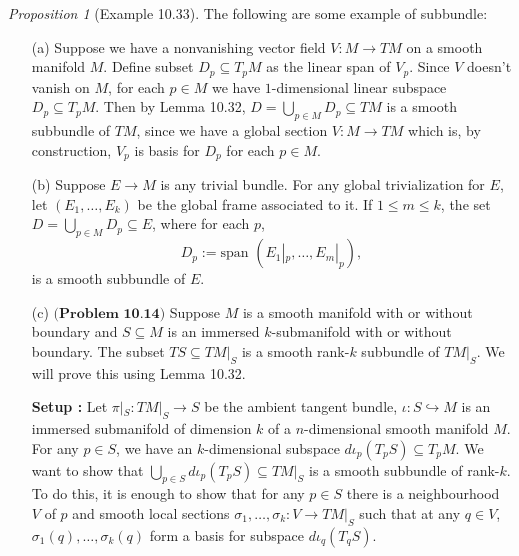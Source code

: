 \documentclass[a4paper]{article}
\theoremstyle{remark}
\newtheorem{prop}{Proposition}
\newcommand{\subhim}{\subseteq} %
\begin{document}
\begin{prop}[Example 10.33]
The following are some example of subbundle:
\begin{enumerate}
\item[(a)] Suppose we have a nonvanishing vector field $V : M \to TM$ on a smooth manifold $M$. Define subset $D_p \subhim T_pM$ as the linear span of $V_p$. Since $V$ doesn't vanish on $M$, for each $p \in M$ we have $1$-dimensional linear subspace $D_p \subhim T_pM$. Then by Lemma 10.32, $D = \bigcup_{p \in M}D_p \subhim TM$ is a smooth subbundle of $TM$, since we have a global section $V : M \to TM$ which is, by construction, $V_p$ is basis for $D_p$ for each $p \in M$.
\item[(b)] Suppose $E \to M$ is any trivial bundle. For any global trivialization for $E$, let $(E_1,\dots,E_k)$ be the global frame associated to it. If $1\leq m \leq k$, the set $D=\bigcup_{p \in M}D_p \subhim E$, where for each $p$, 
$$
D_p:= \text{span }(E_1|_p ,\dots, E_m|_p),
$$
is a smooth subbundle of $E$.

\item[(c)] $\textbf{(Problem 10.14)}$ Suppose $M$ is a smooth manifold with or without boundary and $S\subhim M$ is an immersed $k$-submanifold with or without boundary. The subset $TS \subhim TM|_S$ is a smooth rank-$k$ subbundle of $TM|_S$. We will prove this using Lemma 10.32. 

\textbf{Setup : } Let $ \pi|_S : TM|_S \to S$ be the ambient tangent bundle, $\iota : S \hookrightarrow M$ is an immersed submanifold of dimension $k$ of a $n$-dimensional smooth manifold $M$.  For any $p \in S$, we have an $k$-dimensional subspace $d\iota_p (T_pS) \subhim T_pM$. We want to show that $\bigcup_{p \in S} d\iota_p(T_pS) \subhim TM|_S$ is a smooth subbundle of rank-$k$. To do this, it is enough to show that for any $p \in S$ there is a neighbourhood $V$ of $p$ and smooth local sections $\sigma_1,\dots,\sigma_k :V \to TM|_S$ such that at any $q \in V$, $\sigma_1(q),\dots,\sigma_k(q)$ form a basis for subspace $d\iota_q(T_qS)$.


\end{enumerate}
\end{prop}
\end{document}
